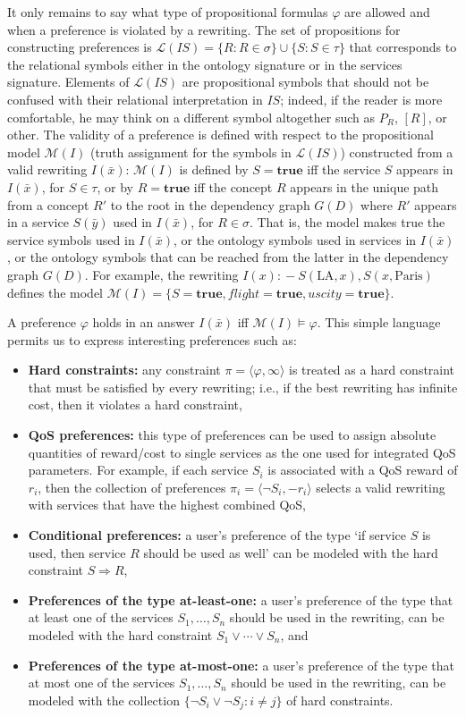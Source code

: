 \documentclass{llncs}
\newcommand{\tup}[1]{\langle #1 \rangle}
\newcommand{\qrule}{:\!\!-}
\renewcommand{\L}{\mathcal{L}}
\newcommand{\M}{\mathcal{M}}
\newcommand{\flight}{\textit{flight}}
\newcommand{\UScity}{\textit{uscity}}
\newcommand{\PA}{\text{Paris}}
\newcommand{\LA}{\text{LA}}
\begin{document}
It only remains to say what type of propositional formulas $\varphi$
are allowed and when a preference is violated by a rewriting.
The set of propositions for constructing preferences is
$\L(IS)=\{ R : R\in\sigma \} \cup \{S : S\in\tau \}$ that corresponds
to the relational symbols either in the ontology signature or in the
services signature. Elements of $\L(IS)$ are propositional symbols that
should not be confused with their relational interpretation in $IS$;
indeed, if the reader is more comfortable, he may think on a different
symbol altogether such as $P_R$, $[R]$, or other.
The validity of a preference is defined with respect to the propositional
model $\M(I)$ (truth assignment for the symbols in $\L(IS)$) constructed
from a valid rewriting $I(\bar x)$:
$\M(I)$ is defined by $S=\textbf{true}$ iff the service $S$ appears in
$I(\bar x)$, for $S\in\tau$, or by $R=\textbf{true}$ iff the concept $R$
appears in the unique path from a concept $R'$ to the root in the dependency
graph $G(D)$ where $R'$ appears in a service $S(\bar y)$ used in $I(\bar x)$,
for $R\in\sigma$.
That is, the model makes true the service symbols used in $I(\bar x)$, or
the ontology symbols used in services in $I(\bar x)$, or the ontology symbols
that can be reached from the latter in the dependency graph $G(D)$.
For example, the rewriting $I(x)\qrule S(\LA,x),S(x,\PA)$ defines
the model $\M(I)=\{S=\textbf{true},\flight=\textbf{true},\UScity=\textbf{true}\}$.

A preference $\varphi$ holds in an answer $I(\bar x)$ iff $\M(I)\vDash\varphi$.
This simple language permits us to express interesting preferences such as:
\begin{itemize}
\item \textbf{Hard constraints:} any constraint $\pi=\tup{\varphi,\infty}$
is treated as a hard constraint that must be satisfied by every rewriting;
i.e., if the best rewriting has infinite cost, then it violates a hard constraint,
\item \textbf{QoS preferences:} this type of preferences can be used to
assign absolute quantities of reward/cost to single services as the one
used for integrated QoS parameters. For example, if each service $S_i$
is associated with a QoS reward of $r_i$, then the collection of preferences
$\pi_i=\tup{\neg S_i,-r_i}$ selects a valid rewriting with services that
have the highest combined QoS,
\item \textbf{Conditional preferences:} a user's preference of the type
`if service $S$ is used, then service $R$ should be used as well' can be
modeled with the hard constraint $S \Rightarrow R$,
\item \textbf{Preferences of the type at-least-one:} a user's preference
of the type that at least one of the services $S_1,\ldots,S_n$ should be
used in the rewriting, can be modeled with the hard constraint $S_1\lor\cdots\lor S_n$, and
\item \textbf{Preferences of the type at-most-one:} a user's preference
of the type that at most one of the services $S_1,\ldots,S_n$ should be
used in the rewriting, can be modeled with the collection
$\{\neg S_i\lor\neg S_j: i\neq j\}$ of hard constraints.
\end{itemize}
\end{document}
